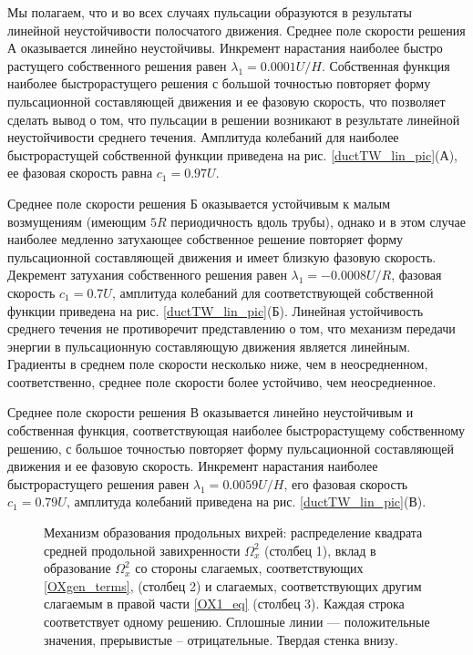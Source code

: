 Мы полагаем, что и во всех случаях пульсации образуются в результаты линейной неустойчивости полосчатого движения. 
Среднее поле скорости решения А оказывается линейно неустойчивы. Инкремент нарастания наиболее быстро растущего собственного решения равен $\lambda_1 = 0.0001U/H$. Собственная функция наиболее быстрорастущего решения с большой точностью повторяет форму пульсационной составляющей движения и ее фазовую скорость, что позволяет сделать вывод о том, что пульсации в решении возникают в результате линейной неустойчивости среднего течения. Амплитуда колебаний для наиболее быстрорастущей собственной функции приведена на рис. \ref{ductTW_lin_pic}(А), ее фазовая скорость равна $c_1=0.97U$. 

Среднее поле скорости решения Б оказывается устойчивым к малым возмущениям (имеющим $5R$ периодичность вдоль трубы), однако и в этом случае наиболее медленно затухающее собственное решение повторяет форму пульсационной составляющей движения и имеет близкую фазовую скорость. Декремент затухания собственного решения равен $\lambda_1 = -0.0008U/R$, фазовая скорость $c_1 = 0.7U$, амплитуда колебаний для соответствующей собственной функции приведена на рис. \ref{ductTW_lin_pic}(Б). Линейная устойчивость среднего течения не противоречит представлению о том, что механизм передачи энергии в пульсационную составляющую движения является линейным. Градиенты в среднем поле скорости несколько ниже, чем в неосредненном, соответственно, среднее поле скорости более устойчиво, чем неосредненное. 

Среднее поле скорости решения В оказывается линейно неустойчивым и собственная функция, соответствующая наиболее быстрорастущему собственному решению, с большое точностью повторяет форму пульсационной составляющей движения и ее фазовую скорость. Инкремент нарастания наиболее быстрорастущего решения равен $\lambda_1 = 0.0059U/H$, его фазовая скорость $c_1 = 0.79U$, амплитуда колебаний приведена на рис. \ref{ductTW_lin_pic}(В). 

\begin{figure}
\caption{Механизм образования продольных вихрей: распределение квадрата средней продольной завихренности $\Omega_x^2$ (столбец 1), вклад в образование $\Omega_x^2$ со стороны слагаемых, соответствующих \eqref{OXgen_terms}, (столбец 2) и слагаемых, соответствующих другим слагаемым в правой части \eqref{OX1_eq} (столбец 3). Каждая строка соответствует одному решению. Сплошные линии --- положительные значения, прерывистые -- отрицательные. Твердая стенка внизу.}
\label{ductTW_OXgen_pic}
\end{figure}

